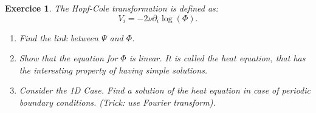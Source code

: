 \documentclass[10pt,a4paper]{article}
\newtheorem{exercici}{Exercice}
\theoremstyle{remark}
\begin{document}
\begin{exercici}
  The Hopf-Cole transformation is defined as:
  \begin{equation}
    V_i = -2\nu \partial_i \log(\Phi).\label{eq:21}
  \end{equation}
  \begin{enumerate}
    \item Find the link between $\Psi$ and $\Phi$.
    \item Show that the equation for $\Phi$ is linear. It is called the heat equation, that has the interesting property of having simple solutions.
    \item Consider the 1D Case. Find a solution of the heat equation in case of periodic boundary conditions. (Trick: use Fourier transform).
  \end{enumerate}
\end{exercici}
\end{document}
